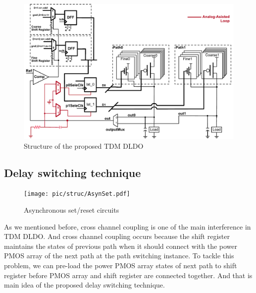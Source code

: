 \documentclass[journal]{IEEEtran}
\begin{document}
\begin{figure}[t!]
    \centering
    \includegraphics{pic/struc/sche.pdf}
    \caption{Structure of the proposed TDM DLDO}
    \label{fig:diag}
\end{figure}
\subsection{Delay switching technique}
\begin{figure}[t!]
    \centering
    \texttt{[image: pic/struc/AsynSet.pdf]}
    \caption{Asynchronous set/reset circuits}
    \label{fig:Asyn}
\end{figure}
As we mentioned before, cross channel coupling is one of the main interference in TDM DLDO. And cross channel coupling occurs because the shift register maintains the states of previous path when it should connect with the power PMOS array of the next path at the path switching instance. To tackle this problem, we can pre-load the power PMOS array states of next path to shift register before PMOS array and shift register are connected together. And that is main idea of the proposed delay switching technique.
\end{document}

